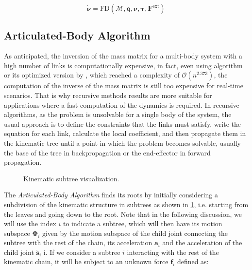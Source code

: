 \begin{equation}
    \dot{\boldsymbol{\nu}} = \mathrm{FD} (\mathcal{M}, \mathbf{q}, \boldsymbol{\nu}, \boldsymbol{\tau}, \mathbf{F} ^{\text{ext}})
\end{equation}

\subsection{Articulated-Body Algorithm}
\label{subsec:back_aba}

As anticipated, the inversion of the mass matrix for a multi-body system with a high number of links is computationally expensive, in fact, even using \citet{coppersmith_matrix_1990} algorithm or its optimized version by \citet{vassilevska-williams2012breaking}, which reached a complexity of $\mathcal{O}(n^{2.373})$, the computation of the inverse of the mass matrix is still too expensive for real-time scenarios. That is why recursive methods results are more suitable for applications where a fast computation of the dynamics is required. In recursive algorithms, as the problem is unsolvable for a single body of the system, the usual approach is to define the constraints that the links must satisfy, write the equation for each link, calculate the local coefficient, and then propagate them in the kinematic tree until a point in which the problem becomes solvable, usually the base of the tree in backpropagation or the end-effector in forward propagation.

\begin{figure}
    \centering
    \caption{Kinematic subtree visualization.}
    \label{fig:kin_tree}
\end{figure}

The \textit{Articulated-Body Algorithm} \citep{featherstone_rigid_2008} finds its roots by initially considering a subdivision of the kinematic structure in subtrees as shown in \cref{fig:kin_tree}, i.e. starting from the leaves and going down to the root.
Note that in the following discussion, we will use the index $i$ to indicate a subtree, which will then have its motion subspace $\boldsymbol{\Phi}_i$ given by the motion subspace of the child joint connecting the subtree with the rest of the chain, its acceleration $\mathbf{a}_i$ and the acceleration of the child joint  $\ddot{\mathbf{s}} _i$ i.
If we consider a subtree $i$ interacting with the rest of the kinematic chain, it will be subject to an unknown force $\mathbf{f} _i$ defined as:

